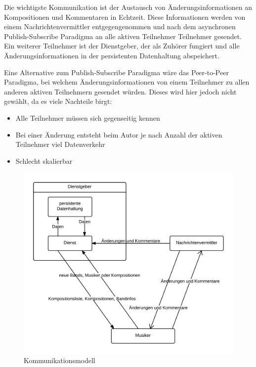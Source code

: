 \documentclass[12pt]{scrartcl}
\begin{document}
Die wichtigste Kommunikation ist der Austausch von Änderungsinformationen an Kompositionen und Kommentaren in Echtzeit. Diese Informationen werden von einem Nachrichtenvermittler entgegengenommen und nach dem asynchronen Publish-Subscribe Paradigma an alle aktiven Teilnehmer Teilnehmer gesendet. Ein weiterer Teilnehmer ist der Dienstgeber, der als Zuhörer fungiert und alle Änderungsinformationen in der persistenten Datenhaltung abspeichert.

Eine Alternative zum Publish-Subscribe Paradigma wäre das Peer-to-Peer Paradigma, bei welchem Änderungsinformationen von einem Teilnehmer zu allen anderen aktiven Teilnehmern gesendet würden. Dieses wird hier jedoch nicht gewählt, da es viele Nachteile birgt:
\begin{itemize}
\item Alle Teilnehmer müssen sich gegenseitig kennen
\item Bei einer Änderung entsteht beim Autor je nach Anzahl der aktiven Teilnehmer viel Datenverkehr
\item Schlecht skalierbar
\end{itemize}


\begin{figure}
\centering
\includegraphics[scale=.25]{figures/kommunikationsmodell}
\caption{Kommunikationsmodell}
\label{fig:kommunikationsmodell}
\end{figure}
\end{document}
